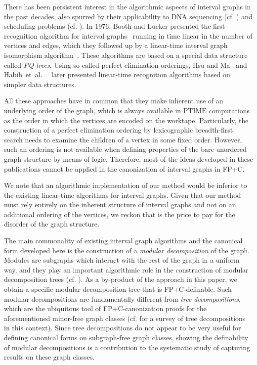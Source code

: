\documentclass[10pt]{article}
\theoremstyle{remark}
\theoremstyle{definition}
\theoremstyle{plain}
\def\etal{~et~al.\ }
\newcommand{\logic}[1]{\textsf{\upshape\relsize{-0.5}#1}\xspace}
\newcommand{\FPC}{\logic{FP+C}}
\newcommand{\cclass}[1]{\ensuremath{\mathrm{#1}}\xspace}
\newcommand{\PTIME}{\cclass{PTIME}}
\begin{document}
There has been persistent interest in the algorithmic aspects of interval graphs in the past decades, also spurred by their applicability to DNA sequencing (cf. \cite{zhang94algorithm}) and scheduling problems (cf. \cite{moehring84algorithmic}). In 1976, Booth and Lueker presented the first recognition algorithm for interval graphs~\cite{booth76testing} running in time linear in the number of vertices and edges, which they followed up by a linear-time interval graph isomorphism algorithm~\cite{lueker79linear}. These algorithms are based on a special data structure called \emph{PQ-trees}. Using so-called perfect elimination orderings, Hsu and Ma~\cite{hsu99fast} and Habib\etal~\cite{habib00lex-bfs} later presented linear-time recognition algorithms based on simpler data structures.

All these approaches have in common that they make inherent use of an underlying order of the graph, which is always available in \PTIME computations as the order in which the vertices are encoded on the worktape. Particularly, the construction of a perfect elimination ordering by lexicographic breadth-first search needs to examine the children of a vertex in some fixed order. However, such an ordering is not available when defining properties of the bare unordered graph structure by means of logic. Therefore, most of the ideas developed in these publications cannot be applied in the canonization of interval graphs in \FPC.

We note that an algorithmic implementation of our method would be inferior to the existing linear-time algorithms for interval graphs. Given that our method must rely entirely on the inherent structure of interval graphs and not on an additional ordering of the vertices, we reckon that is the price to pay for the disorder of the graph structure.

The main commonality of existing interval graph algorithms and the canonical form developed here is the construction of a \emph{modular decomposition} of the graph. Modules are subgraphs which interact with the rest of the graph in a uniform way, and they play an important algorithmic role in the construction of modular decomposition trees (cf. \cite{brandstaedt99graph}). As a by-product of the approach in this paper, we obtain a specific modular decomposition tree that is \FPC-definable. Such modular decompositions are fundamentally different from \emph{tree decompositions}, which are the ubiquitous tool of \FPC-canonization proofs for the aforementioned minor-free graph classes (cf. \cite{grohe08definable} for a survey of tree decompositions in this context). Since tree decompositions do not appear to be very useful for defining canonical forms on subgraph-free graph classes, showing the definability of modular decompositions is a contribution to the systematic study of capturing results on these graph classes.
\end{document}

